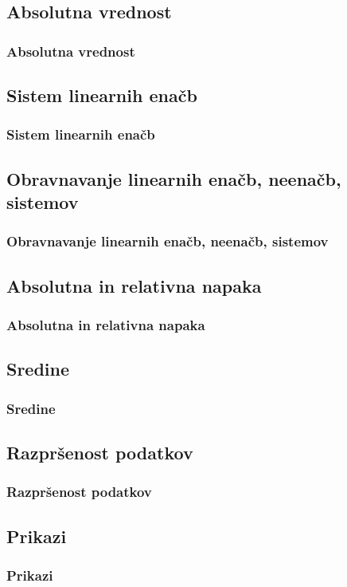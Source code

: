     \subsection{Absolutna vrednost}

        \begin{frame}
            \frametitle{Absolutna vrednost}
        \end{frame}

    \subsection{Sistem linearnih enačb}

        \begin{frame}
            \frametitle{Sistem linearnih enačb}
        \end{frame}

    \subsection{Obravnavanje linearnih enačb, neenačb, sistemov}

        \begin{frame}
            \frametitle{Obravnavanje linearnih enačb, neenačb, sistemov}
        \end{frame}

    \subsection{Absolutna in relativna napaka}

        \begin{frame}
            \frametitle{Absolutna in relativna napaka}
        \end{frame}

    \subsection{Sredine}

        \begin{frame}
            \frametitle{Sredine}
        \end{frame}

    \subsection{Razpršenost podatkov}

        \begin{frame}
            \frametitle{Razpršenost podatkov}
        \end{frame}

    \subsection{Prikazi}
        
        \begin{frame}
            \frametitle{Prikazi}
        \end{frame}